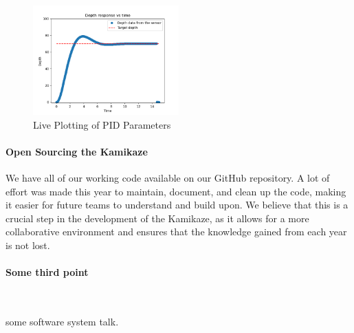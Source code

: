 \begin{figure}[h]
    \centering
    \includegraphics[width=0.5\textwidth]{Sections/2Design Rationale/images/Pid.png}
    \caption{Live Plotting of PID Parameters}
    \label{fig:pid_live}
\end{figure}

\paragraph{Open Sourcing the Kamikaze}
We have all of our working code available on our GitHub repository. A lot of effort
was made this year to maintain, document, and clean up the code, making it easier
for future teams to understand and build upon. We believe that this is a crucial
step in the development of the Kamikaze, as it allows for a more collaborative
environment and ensures that the knowledge gained from each year is not lost. 




\paragraph{Some third point} \ \\
\vspace{-0.5cm}

some software system talk.